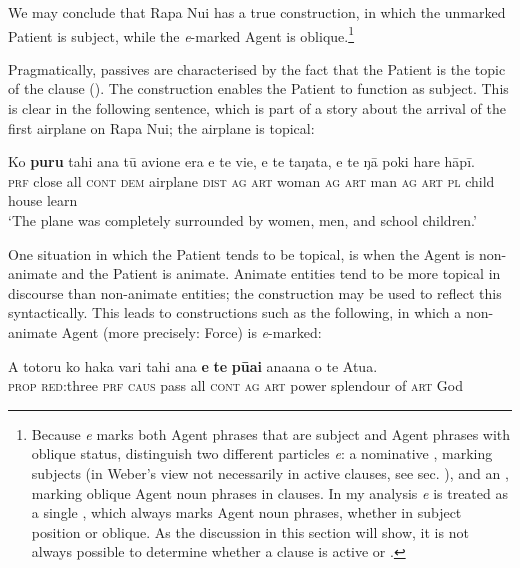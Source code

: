 We may conclude that Rapa Nui has a true  construction, in which the unmarked Patient is subject, while the \textit{e}{}-marked Agent is oblique.\footnote{\label{fn:414}Because \textit{e} marks both Agent phrases that are subject and Agent phrases with oblique status, \citet[60]{WeberN2003} distinguish two different particles \textit{e}: a nominative , marking subjects (in Weber’s view not necessarily  in active clauses, see sec. ), and an  , marking oblique Agent noun phrases in  clauses. In my analysis \textit{e} is treated as a single , which always marks Agent noun phrases, whether in subject position or oblique. As the discussion in this section will show, it is not always possible to determine whether a clause is active or .} 

Pragmatically, passives are characterised by the fact that the Patient is the topic of the clause (\citealt[326]{KeenanDryer2007}). The  construction enables the Patient to function as subject. This is clear in the following sentence, which is part of a story about the arrival of the first airplane on Rapa Nui; the airplane is topical:

\ea\label{ex:8.53}
\gll Ko \textbf{puru} tahi {\ꞌ}ana tū {\ꞌ}avione era e te vi{\ꞌ}e, e te taŋata, e te ŋā poki hare hāpī.\\
\textsc{prf} close all \textsc{cont} \textsc{dem} airplane \textsc{dist} \textsc{ag} \textsc{art} woman \textsc{ag} \textsc{art} man \textsc{ag} \textsc{art} \textsc{pl} child house learn\\

\glt
‘The plane was completely surrounded by women, men, and school children.’ \textstyleExampleref{[R379.012]} 
\z

One situation in which the Patient tends to be topical, is when the Agent is non-animate and the Patient is animate. Animate entities tend to be more topical in discourse than non-animate entities; the  construction may be used to reflect this syntactically. This leads to constructions such as the following, in which a non-animate Agent (more precisely: Force) is \textit{e}{}-marked:

\ea\label{ex:8.54}
\gll A totoru ko haka vari tahi {\ꞌ}ana \textbf{e} \textbf{te} \textbf{pūai} {\ꞌ}ana{\ꞌ}ana o te {\ꞌ}Atua.\\
\textsc{prop} \textsc{red}:three \textsc{prf} \textsc{caus} pass all \textsc{cont} \textsc{ag} \textsc{art} power splendour of \textsc{art} God\\


